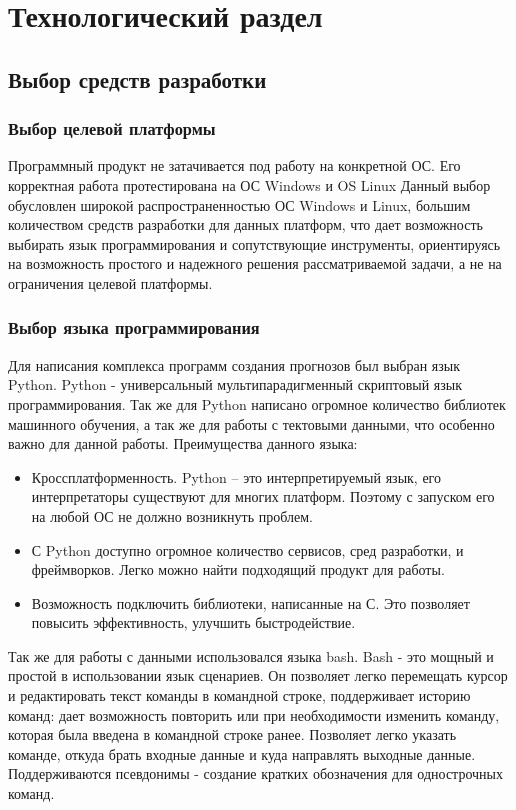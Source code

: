 \chapter{Технологический раздел}
\section{Выбор средств разработки}
\subsection{Выбор целевой платформы}
Программный продукт  не затачивается под работу на конкретной ОС. Его корректная работа протестирована на ОС Windows и OS Linux Данный выбор обусловлен широкой распространенностью ОС Windows и Linux, большим количеством средств разработки для данных платформ, что дает возможность выбирать
язык программирования и сопутствующие инструменты, ориентируясь на возможность простого и надежного решения рассматриваемой
задачи, а не на ограничения целевой платформы.


\subsection{Выбор языка программирования}
Для написания комплекса программ создания прогнозов был выбран язык Python.
Python - универсальный мультипарадигменный скриптовый язык программирования. Так же для Python написано огромное количество библиотек машинного обучения, а так же для работы с тектовыми данными, что особенно важно для данной работы.
Преимущества данного языка:
\begin{itemize}
	\item Кроссплатформенность. Python – это интерпретируемый язык, его интерпретаторы существуют для многих платформ. Поэтому с запуском его на любой ОС не должно возникнуть проблем.
	\item С Python доступно огромное количество сервисов, сред разработки, и фреймворков. Легко можно найти подходящий продукт для работы.
	\item Возможность подключить библиотеки, написанные на С. Это позволяет повысить эффективность, улучшить быстродействие.
\end{itemize}



Так же для работы с данными использовался языка bash. Bash - это мощный и простой в использовании язык сценариев. Он позволяет 	 легко перемещать курсор и редактировать текст команды в командной строке, поддерживает историю команд: дает возможность повторить или при необходимости изменить команду, которая была введена в командной строке ранее. Позволяет легко указать команде, откуда брать входные данные и куда направлять выходные данные. Поддерживаются псевдонимы - создание кратких обозначения для однострочных команд.

